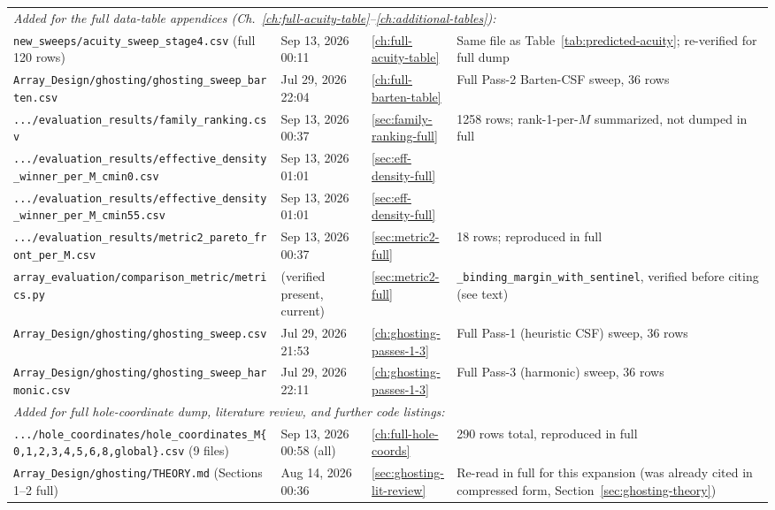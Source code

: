 \begin{longtable}{p{5.8cm}p{2.4cm}p{1.2cm}p{5.4cm}}
\midrule
\multicolumn{4}{l}{\textit{Added for the full data-table appendices (Ch.~\ref{ch:full-acuity-table}--\ref{ch:additional-tables}):}} \\
\texttt{new\_sweeps/acuity\_sweep\_stage4.csv} (full 120 rows) & Sep 13, 2026 00:11 & \ref{ch:full-acuity-table} & Same file as Table~\ref{tab:predicted-acuity}; re-verified for full dump \\
\texttt{Array\_Design/ghosting/ghosting\_sweep\_barten.csv} & Jul 29, 2026 22:04 & \ref{ch:full-barten-table} & Full Pass-2 Barten-CSF sweep, 36 rows \\
\texttt{.../evaluation\_results/family\_ranking.csv} & Sep 13, 2026 00:37 & \ref{sec:family-ranking-full} & 1258 rows; rank-1-per-$M$ summarized, not dumped in full \\
\texttt{.../evaluation\_results/effective\_density\_winner\_per\_M\_cmin0.csv} & Sep 13, 2026 01:01 & \ref{sec:eff-density-full} & \\
\texttt{.../evaluation\_results/effective\_density\_winner\_per\_M\_cmin55.csv} & Sep 13, 2026 01:01 & \ref{sec:eff-density-full} & \\
\texttt{.../evaluation\_results/metric2\_pareto\_front\_per\_M.csv} & Sep 13, 2026 00:37 & \ref{sec:metric2-full} & 18 rows; reproduced in full \\
\texttt{array\_evaluation/comparison\_metric/metrics.py} & (verified present, current) & \ref{sec:metric2-full} & \texttt{\_binding\_margin\_with\_sentinel}, verified before citing (see text) \\
\texttt{Array\_Design/ghosting/ghosting\_sweep.csv} & Jul 29, 2026 21:53 & \ref{ch:ghosting-passes-1-3} & Full Pass-1 (heuristic CSF) sweep, 36 rows \\
\texttt{Array\_Design/ghosting/ghosting\_sweep\_harmonic.csv} & Jul 29, 2026 22:11 & \ref{ch:ghosting-passes-1-3} & Full Pass-3 (harmonic) sweep, 36 rows \\
\midrule
\multicolumn{4}{l}{\textit{Added for full hole-coordinate dump, literature review, and further code listings:}} \\
\texttt{.../hole\_coordinates/hole\_coordinates\_M\{0,1,2,3,4,5,6,8,global\}.csv} (9 files) & Sep 13, 2026 00:58 (all) & \ref{ch:full-hole-coords} & 290 rows total, reproduced in full \\
\texttt{Array\_Design/ghosting/THEORY.md} (Sections 1--2 full) & Aug 14, 2026 00:36 & \ref{sec:ghosting-lit-review} & Re-read in full for this expansion (was already cited in compressed form, Section~\ref{sec:ghosting-theory}) \\

\end{longtable}

